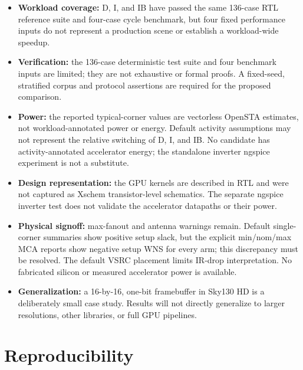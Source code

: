 \documentclass[10pt,a4paper]{article}
\begin{document}
\begin{itemize}[leftmargin=1.5em]
  \item \textbf{Workload coverage:} D, I, and IB have passed the same
        136-case RTL reference suite and four-case cycle benchmark, but four
        fixed performance inputs do not represent a production scene or
        establish a workload-wide speedup.
  \item \textbf{Verification:} the 136-case deterministic test suite and
        four benchmark inputs are limited; they are not exhaustive or formal
        proofs. A fixed-seed, stratified corpus and protocol assertions are
        required for the proposed comparison.
  \item \textbf{Power:} the reported typical-corner values are vectorless
        OpenSTA estimates, not workload-annotated power or energy.
        Default activity assumptions may not represent the relative
        switching of D, I, and IB. No candidate has activity-annotated
        accelerator energy; the standalone inverter ngspice experiment is
        not a substitute.
  \item \textbf{Design representation:} the GPU kernels are described in
        RTL and were not captured as Xschem transistor-level schematics.
        The separate ngspice inverter test does not validate the accelerator
        datapaths or their power.
  \item \textbf{Physical signoff:} max-fanout and antenna warnings remain.
        Default single-corner summaries show positive setup slack, but the
        explicit min/nom/max MCA reports show negative setup WNS for every
        arm; this discrepancy must be resolved. The default VSRC placement
        limits IR-drop interpretation. No fabricated silicon or measured
        accelerator power is available.
  \item \textbf{Generalization:} a 16-by-16, one-bit framebuffer in Sky130 HD
        is a deliberately small case study. Results will not directly
        generalize to larger resolutions, other libraries, or full GPU
        pipelines.
\end{itemize}

\section{Reproducibility}
\end{document}
